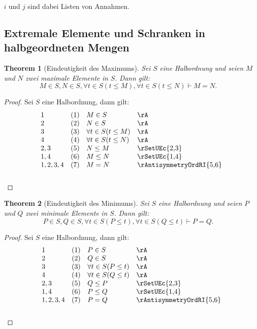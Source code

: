 \documentclass{book}
\theoremstyle{plain}
\newtheorem{theorem}{Theorem}
\theoremstyle{remark}
\theoremstyle{definition}
\begin{document}
\(i\) und \(j\) sind dabei Listen von Annahmen.

\subsection{Extremale Elemente und Schranken in halbgeordneten Mengen}


\label{MInSwNInSwFatInSLptLeqMRpwFatInSLptLeqNRpImpMEqualsN}
\begin{theorem}[Eindeutigkeit des Maximums]
    Sei \( S \) eine Halbordnung und seien \( M \) und \( N \) zwei maximale Elemente in \( S \). Dann gilt:
    \[
    M\in S, N\in S, \forall t \in S(t \leq M), \forall t \in S(t \leq N) \vdash M = N.
    \]
\end{theorem}

\begin{proof}
    Sei \(S\) eine Halbordnung, dann gilt:
    \[
    \begin{array}{lll p{4cm}}
        1 & (1) & M\in S & \rA \\
        2 & (2) & N\in S & \rA \\
        3 & (3) & \forall t \in S(t \leq M) & \rA \\
        4 & (4) & \forall t \in S(t \leq N) & \rA \\
        2,3 & (5) & N\leq M & \rSetUEc{2,3}  \\
        1,4 & (6) & M\leq N & \rSetUEc{1,4} \\
        1,2,3,4 & (7) & M = N & \rAntisymmetryOrdRI{5,6} \\
    \end{array}
    \]
\end{proof}

\label{PInSwQInSwFatInSLpPLeqtRpwFatInSLpQLeqtRpImpPEqualsQ}
\begin{theorem}[Eindeutigkeit des Minimums]
    Sei \( S \) eine Halbordnung und seien \( P \) und \( Q \) zwei minimale Elemente in \( S \). Dann gilt:
    \[
    P \in S, Q \in S, \forall t \in S(P \leq t), \forall t \in S(Q \leq t) \vdash P = Q.
    \]
\end{theorem}

\begin{proof}
    Sei \(S\) eine Halbordnung, dann gilt:
    \[
    \begin{array}{lll p{4cm}}
        1 & (1) & P \in S & \rA \\
        2 & (2) & Q \in S & \rA \\
        3 & (3) & \forall t \in S (P \leq t) & \rA \\
        4 & (4) & \forall t \in S (Q \leq t) & \rA \\
        2,3 & (5) & Q \leq P & \rSetUEc{2,3}  \\
        1,4 & (6) & P \leq Q & \rSetUEc{1,4} \\
        1,2,3,4 & (7) & P = Q & \rAntisymmetryOrdRI{5,6} \\
    \end{array}
    \]
\end{proof}
\end{document}

